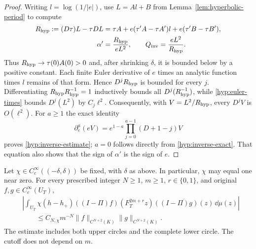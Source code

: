 \begin{proof}
Writing $l=\log(1/|e|)$, use $L=Al+B$ from
Lemma~\ref{lem:hyperbolic-period} to compute
\begin{align}
 R_{\rm hyp}:=(D\tau)L-\tau DL
 &=\tau A+e(\tau'A-\tau A')l
                 +e(\tau'B-\tau B'),\label{hyp:inverse-R}\\
 \alpha'&=\frac{R_{\rm hyp}}{eL^2},\qquad
 Q_{\rm inv}=\frac{eL^2}{R_{\rm hyp}}.\label{hyp:inverse-exact}
\end{align}
Thus $R_{\rm hyp}\to\tau(0)A(0)>0$ and, after shrinking $\delta$,
it is bounded below by a positive constant.  Each finite Euler
derivative of $e$ times an analytic function times $l$ remains of
that form.  Hence $D^jR_{\rm hyp}$ is bounded for every $j$.
Differentiating $R_{\rm hyp}R_{\rm hyp}^{-1}=1$ inductively bounds all
$D^j(R_{\rm hyp}^{-1})$, while \eqref{hyp:euler-times} bounds
$D^j(L^2)$ by $C_j\ell^2$.  Consequently, with
$V=L^2/R_{\rm hyp}$, every $D^jV$ is $O(\ell^2)$.
For $a\ge1$ the exact identity
\[
 \partial_e^a(eV)=e^{1-a}
          \prod_{j=0}^{a-1}(D+1-j)V
\]
proves \eqref{hyp:inverse-estimate}; $a=0$ follows directly from
\eqref{hyp:inverse-exact}.  That equation also shows that the sign
of $\alpha'$ is the sign of $e$.
\end{proof}

\begin{proposition}\label{prop:hyperbolic-decay}
Let $\chi\in C_c^\infty((-\delta,\delta))$ be fixed, with
$\delta$ as above. In particular, $\chi$ may equal one near zero.
For every prescribed integer
$N\ge1$, $m\ge1$, $r\in\{0,1\}$, and original
$f,g\in C_c^\infty(U_T)$,
\begin{equation}\label{hyp:decay}
 \begin{aligned}
 &\left|\int_{U_T}\chi(h-h_+)
 ((I-\Pi)f)(F_T^{2m+r}z)
       \overline{((I-\Pi)g)(z)}\,\dd\mu(z)\right|\\
 &\qquad\le C_{N,\chi}m^{-N}
          \|f\|_{C^{N+2}(K)}\|g\|_{C^{N+2}(K)}.
 \end{aligned}
\end{equation}
The estimate includes both upper circles and the complete lower
circle.  The cutoff does not depend on $m$.
\end{proposition}

